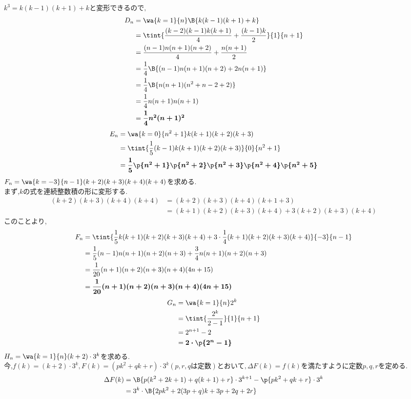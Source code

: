 \documentclass[10pt,fleqn,a4paper]{jsarticle}
\newcommand{\ans}[1]{\mbox{\boldmath{$#1$}}}
\begin{document}
$k^3=k(k-1)(k+1)+kと変形できるので,$
\begin{align*}
  D_n&=\wa{k=1}{n}\B{k(k-1)(k+1)+k}\\
  &=\tint{\dfrac{(k-2)(k-1)k(k+1)}{4}+\dfrac{(k-1)k}{2}}{1}{n+1}\\
  &=\dfrac{(n-1)n(n+1)(n+2)}{4}+\dfrac{n(n+1)}{2}\\
  &=\dfrac{1}{4}\B{(n-1)n(n+1)(n+2)+2n(n+1)}\\
  &=\dfrac{1}{4}\B{n(n+1)(n^2+n-2+2)}\\
  &=\dfrac{1}{4}n(n+1)n(n+1)\\
  &=\ans{\dfrac{1}{4}n^2(n+1)^2}
\end{align*}
\kakkogob 
\begin{align*}
E_n&=\wa{k=0}{n^2+1}k(k+1)(k+2)(k+3)\\
&=\tint{\dfrac{1}{5}(k-1)k(k+1)(k+2)(k+3)}{0}{n^2+1}\\
&=\ans{\dfrac{1}{5}\p{n^2+1}\p{n^2+2}\p{n^2+3}\p{n^2+4}\p{n^2+5}}
\end{align*}
\kakkorokub $F_n=\wa{k=-3}{n-1}(k+2)(k+3)(k+4)(k+4)$を求める.\\
まず,$k$の式を連続整数積の形に変形する.
\begin{align*}
  (k+2)(k+3)(k+4)(k+4)&=(k+2)(k+3)(k+4)(k+1+3)\\
  &=(k+1)(k+2)(k+3)(k+4)+3(k+2)(k+3)(k+4)
\end{align*}
このことより,
\begin{align*}
  F_n&=\tint{\dfrac{1}{5}k(k+1)(k+2)(k+3)(k+4)+3\cdot\dfrac{1}{4}(k+1)(k+2)(k+3)(k+4)}{-3}{n-1}\\
  &=\dfrac{1}{5}(n-1)n(n+1)(n+2)(n+3)+\dfrac{3}{4}n(n+1)(n+2)(n+3)\\
  &=\dfrac{1}{20}(n+1)(n+2)(n+3)(n+4)(4n+15)\\
  &=\ans{\dfrac{1}{20}(n+1)(n+2)(n+3)(n+4)(4n+15)}
\end{align*}
\newpage
\noindent\kakkoshichib 
\begin{align*}
  G_n&=\wa{k=1}{n}2^k\\
  &=\tint{\dfrac{2^k}{2-1}}{1}{n+1}\\
  &=2^{n+1}-2\\
  &=\ans{2\cdot\p{2^n-1}}
\end{align*}
\kakkohachib $H_n=\wa{k=1}{n}(k+2)\cdot3^k$を求める.\\
今,$f(k)=(k+2)\cdot3^k,F(k)=(pk^2+qk+r)\cdot3^k　(p,r,qは定数)とおいて,\Delta F(k)=f(k)を満たすように
定数p,q,rを定める.$
\begin{align*}
  \Delta F(k)&=\B{p(k^2+2k+1)+q(k+1)+r}\cdot3^{k+1}-\p{pk^2+qk+r}\cdot3^k\\
&=3^k\cdot\B{2pk^2+2(3p+q)k+3p+2q+2r}
\end{align*}
\end{document}
